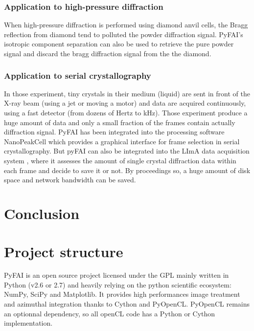 \documentclass[preprint]{iucr}
\begin{document}
\subsubsection{Application to high-pressure diffraction}
When high-pressure diffraction is performed using diamond anvil cells, the Bragg
reflection from diamond tend to polluted the powder diffraction signal. PyFAI's
isotropic component separation can also be used to retrieve the pure powder
signal and discard the bragg diffraction signal from the the diamond.

\subsubsection{Application to serial crystallography}
In those experiment, tiny crystals in their medium (liquid) are sent in front of
the X-ray beam (using a jet or moving a motor) and data are acquired
continuously, using a fast detector (from dozens of Hertz to kHz).
Those experiment produce a huge amount of data and only a small fraction of the
frames contain actually diffraction signal.
PyFAI has been integrated into the processing software NanoPeakCell which
provides a graphical interface for frame selection in serial crystallography.
But pyFAI can also be integrated into the LImA data acquisition system
\cite{lima}, where it assesses the amount of single crystal
diffraction data within each frame and decide to save it or not.
By proceedings so, a huge amount of disk space and network bandwidth can be
saved.

\section{Conclusion}







\appendix
\section{Project structure}
PyFAI is an open source project licensed under the GPL mainly written in Python (v2.6 or 2.7)
and heavily relying on the python scientific ecosystem: NumPy\cite{numpy},
SciPy\cite{scipy} and Matplotlib\cite{matplotlib}.
It provides high performances image treatment and azimuthal integration thanks
to Cython\cite{cython} and PyOpenCL\cite{pyopencl}. PyOpenCL remains an
optionnal dependency, so all openCL\cite{opencl} code has a Python or Cython
implementation.
\end{document}
